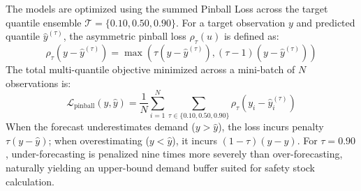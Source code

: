 \documentclass[11pt,a4paper]{article}
\begin{document}
The models are optimized using the summed Pinball Loss across the target quantile ensemble $\mathcal{T} = \{0.10, 0.50, 0.90\}$. For a target observation $y$ and predicted quantile $\hat{y}^{(\tau)}$, the asymmetric pinball loss $\rho_\tau(u)$ is defined as:
\begin{equation}
\rho_\tau(y - \hat{y}^{(\tau)}) = \max\left(\tau(y - \hat{y}^{(\tau)}), (\tau - 1)(y - \hat{y}^{(\tau)})\right)
\end{equation}
The total multi-quantile objective minimized across a mini-batch of $N$ observations is:
\begin{equation}
\mathcal{L}_{\text{pinball}}(y, \hat{y}) = \frac{1}{N} \sum_{i=1}^{N} \sum_{\tau \in \{0.10, 0.50, 0.90\}} \rho_\tau\left(y_i - \hat{y}_i^{(\tau)}\right)
\end{equation}
When the forecast underestimates demand ($y > \hat{y}$), the loss incurs penalty $\tau(y - \hat{y})$; when overestimating ($y < \hat{y}$), it incurs $(1 - \tau)(\hat{y} - y)$. For $\tau = 0.90$, under-forecasting is penalized nine times more severely than over-forecasting, naturally yielding an upper-bound demand buffer suited for safety stock calculation.
\end{document}
